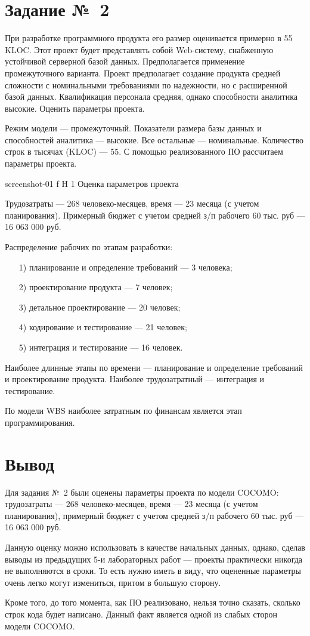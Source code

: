 \documentclass{bmstu}
\begin{document}
\section{Задание №~2}

При разработке программного продукта его размер оценивается
примерно в 55 KLOC. 
Этот проект будет представлять собой Web-систему, снабженную устойчивой серверной базой данных. 
Предполагается применение промежуточного варианта. 
Проект предполагает создание продукта средней сложности с номинальными
требованиями по надежности, но с расширенной базой данных. 
Квалификация персонала средняя, однако способности аналитика высокие. 
Оценить параметры проекта.

Режим модели --- промежуточный. 
Показатели размера базы данных и способностей аналитика --- высокие. 
Все остальные --- номинальные. 
Количество строк в тысячах (KLOC) --- 55. 
С помощью реализованного ПО рассчитаем параметры проекта.

    {screenshot-01}
    {f}
    {H}
    {1\textwidth}
    {Оценка параметров проекта}
    
Трудозатраты --- 268 человеко-месяцев, время --- 23 месяца (с учетом планирования). 
Примерный бюджет с учетом средней з/п рабочего 60 тыс. руб --- 16 063 000 руб.

Распределение рабочих по этапам разработки:
\begin{enumerate}
\item[1)] планирование и определение требований --- 3 человека;
\item[2)] проектирование продукта --- 7 человек;
\item[3)] детальное проектирование --- 20 человек;
\item[4)] кодирование и тестирование --- 21 человек;
\item[5)] интеграция и тестирование --- 16 человек.
\end{enumerate}

Наиболее длинные этапы по времени --- планирование и определение требований и проектирование продукта. 
Наиболее трудозатратный --- интеграция и тестирование.

По модели WBS наиболее затратным по финансам является этап программирования.
    
\section{Вывод}

Для задания №~2 были оценены параметры проекта по модели COCOMO: трудозатраты --- 268 человеко-месяцев, время --- 23 месяца (с учетом планирования), примерный бюджет с учетом средней з/п рабочего 60 тыс. руб --- 16 063 000 руб.

Данную оценку можно использовать в качестве начальных данных, однако, сделав выводы из предыдущих 5-и лабораторных работ --- проекты практически никогда не выполняются в сроки. 
То есть нужно иметь в виду, что оцененные параметры очень легко могут измениться, притом в большую сторону.

Кроме того, до того момента, как ПО реализовано, нельзя точно сказать, сколько строк кода будет написано. 
Данный факт является одной из слабых сторон модели COCOMO.
\end{document}
